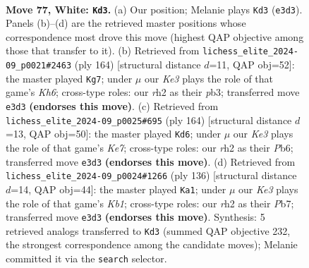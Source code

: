 \documentclass[11pt]{article}
\begin{document}
\clearpage

\begin{figure}[p]\centering
\begin{subfigure}{0.46\textwidth}\centering
\resizebox{\linewidth}{!}{%
\newchessgame
\chessboard[
  setfen={3Q4/q7/5pk1/8/8/4K1P1/7r/8 w - - 4 77},
  showmover=false,
  pgfstyle=straightmove, color=movearrow, markmove={e3-d3}
]}
\caption{}
\end{subfigure}\hfill
\begin{subfigure}{0.46\textwidth}\centering
\resizebox{\linewidth}{!}{%
\newchessgame
\chessboard[
  setfen={8/8/3k3K/8/8/1p6/1Q6/7q w - - 42 83},
  showmover=false,
  pgfstyle=straightmove, color=movearrow, markmove={h6-g7}
]}
\caption{}
\end{subfigure}
\\[4pt]
\begin{subfigure}{0.46\textwidth}\centering
\resizebox{\linewidth}{!}{%
\newchessgame
\chessboard[
  setfen={8/4K3/1P6/3Q4/7q/8/8/5k2 w - - 17 83},
  showmover=false,
  pgfstyle=straightmove, color=movearrow, markmove={e7-d6}
]}
\caption{}
\end{subfigure}\hfill
\begin{subfigure}{0.46\textwidth}\centering
\resizebox{\linewidth}{!}{%
\newchessgame
\chessboard[
  setfen={8/1P5q/8/8/2k5/Q7/8/1K6 w - - 3 69},
  showmover=false,
  pgfstyle=straightmove, color=movearrow, markmove={b1-a1}
]}
\caption{}
\end{subfigure}
\caption{\textbf{Move 77, White: \texttt{Kd3}.} (a) Our position; Melanie plays \texttt{Kd3} (\texttt{e3d3}). Panels (b)--(d) are the retrieved master positions whose correspondence most drove this move (highest QAP objective among those that transfer to it). (b) Retrieved from \texttt{lichess\_elite\_2024-09\_p0021\#2463} (ply 164) [structural distance $d$=11, QAP obj=52]: the master played \texttt{Kg7}; under $\mu$ our \emph{Ke3} plays the role of that game's \emph{Kh6}; cross-type roles: our \emph{r}h2 as their \emph{p}b3; transferred move \texttt{e3d3} \textbf{(endorses this move)}. (c) Retrieved from \texttt{lichess\_elite\_2024-09\_p0025\#695} (ply 164) [structural distance $d$=13, QAP obj=50]: the master played \texttt{Kd6}; under $\mu$ our \emph{Ke3} plays the role of that game's \emph{Ke7}; cross-type roles: our \emph{r}h2 as their \emph{P}b6; transferred move \texttt{e3d3} \textbf{(endorses this move)}. (d) Retrieved from \texttt{lichess\_elite\_2024-09\_p0024\#1266} (ply 136) [structural distance $d$=14, QAP obj=44]: the master played \texttt{Ka1}; under $\mu$ our \emph{Ke3} plays the role of that game's \emph{Kb1}; cross-type roles: our \emph{r}h2 as their \emph{P}b7; transferred move \texttt{e3d3} \textbf{(endorses this move)}. Synthesis: 5 retrieved analogs transferred to \texttt{Kd3} (summed QAP objective 232, the strongest correspondence among the candidate moves); Melanie committed it via the \texttt{search} selector.}
\label{fig:thought-m152}
\end{figure}
\end{document}
